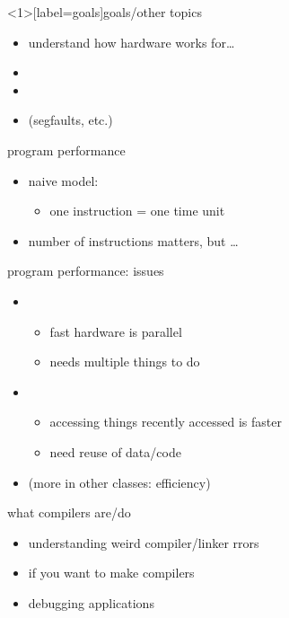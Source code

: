 \begin{frame}<1>[label=goals]{goals/other topics}
    \begin{itemize}
    \item understand how hardware works for\ldots{}
    \item {}
    \item {}
    \item {} (segfaults, etc.)
    \end{itemize}
\end{frame}


\begin{frame}{program performance}
    \begin{itemize}
    \item naive model:
        \begin{itemize}
        \item one instruction = one time unit
        \end{itemize}
    \item number of instructions matters, but \ldots
    \end{itemize}
\end{frame}

\begin{frame}{program performance: issues}
    \begin{itemize}
    \item {}
        \begin{itemize}
        \item fast hardware is parallel
        \item needs multiple things to do
        \end{itemize}
    \item {}
        \begin{itemize}
        \item accessing things recently accessed is faster
        \item need reuse of data/code
        \end{itemize}
    \item (more in other classes:  efficiency)
    \end{itemize}
\end{frame}


\begin{frame}{what compilers are/do}
    \begin{itemize}
    \item understanding weird compiler/linker rrors
    \item if you want to make compilers
    \item debugging applications
    \end{itemize}
\end{frame}

